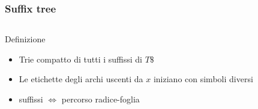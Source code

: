 \begin{frame}[fragile]
\frametitle{Suffix tree}
\begin{columns}
\begin{column}{0.5\textwidth}
\begin{block}{Definizione}
\begin{itemize}[<+->]
\item
Trie compatto di tutti i suffissi di $T\$$
\item
Le etichette degli archi uscenti da $x$ iniziano con simboli diversi
\item
suffissi $\Leftrightarrow$ percorso radice-foglia
\end{itemize}
\end{block}
\end{column}
\begin{column}{0.5\textwidth}
\begin{center}
\end{center}
\end{column}
\end{columns}
\end{frame}

